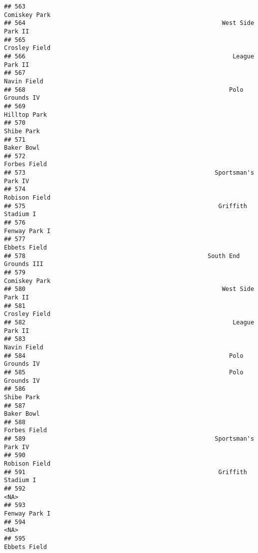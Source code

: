 \documentclass[]{article}
\begin{document}
\begin{verbatim}
## 563                                                           Comiskey Park
## 564                                                       West Side Park II
## 565                                                           Crosley Field
## 566                                                          League Park II
## 567                                                             Navin Field
## 568                                                         Polo Grounds IV
## 569                                                            Hilltop Park
## 570                                                              Shibe Park
## 571                                                              Baker Bowl
## 572                                                            Forbes Field
## 573                                                     Sportsman's Park IV
## 574                                                           Robison Field
## 575                                                      Griffith Stadium I
## 576                                                           Fenway Park I
## 577                                                            Ebbets Field
## 578                                                   South End Grounds III
## 579                                                           Comiskey Park
## 580                                                       West Side Park II
## 581                                                           Crosley Field
## 582                                                          League Park II
## 583                                                             Navin Field
## 584                                                         Polo Grounds IV
## 585                                                         Polo Grounds IV
## 586                                                              Shibe Park
## 587                                                              Baker Bowl
## 588                                                            Forbes Field
## 589                                                     Sportsman's Park IV
## 590                                                           Robison Field
## 591                                                      Griffith Stadium I
## 592                                                                    <NA>
## 593                                                           Fenway Park I
## 594                                                                    <NA>
## 595                                                            Ebbets Field

\end{verbatim}
\end{document}
